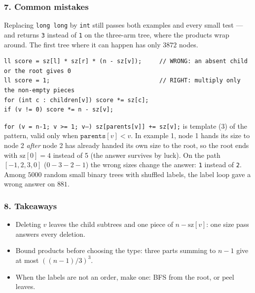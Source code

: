 \subsubsection*{7. Common mistakes}

\begin{warningbox}
Replacing \texttt{long long} by \texttt{int} still passes both examples and every small test --- and returns \texttt{3} instead of \texttt{1} on the three-arm tree, where the products wrap around. The first tree where it can happen has only $3872$ nodes.
\end{warningbox}

\begin{warningbox}
\begin{lstlisting}[style=snippet]
ll score = sz[l] * sz[r] * (n - sz[v]);     // WRONG: an absent child or the root gives 0
ll score = 1;                               // RIGHT: multiply only the non-empty pieces
for (int c : children[v]) score *= sz[c];
if (v != 0) score *= n - sz[v];
\end{lstlisting}
\end{warningbox}

\begin{warningbox}
\texttt{for (v = n-1; v >= 1; v--) sz[parents[v]] += sz[v];} is template (3) of the pattern, valid only when $\texttt{parents}[v] < v$. In example 1, node 1 hands its size to node 2 \emph{after} node 2 has already handed its own size to the root, so the root ends with $\mathrm{sz}[0] = 4$ instead of 5 (the answer survives by luck). On the path $[-1,2,3,0]$ ($0 - 3 - 2 - 1$) the wrong sizes change the answer: \texttt{1} instead of \texttt{2}. Among $5000$ random small binary trees with shuffled labels, the label loop gave a wrong answer on $881$.
\end{warningbox}

\subsubsection*{8. Takeaways}

\begin{itemize}[leftmargin=*]
    \item Deleting $v$ leaves the child subtrees and one piece of $n - \mathrm{sz}[v]$: one size pass answers every deletion.
    \item Bound products before choosing the type: three parts summing to $n - 1$ give at most $((n-1)/3)^3$.
    \item When the labels are not an order, make one: BFS from the root, or peel leaves.
\end{itemize}

